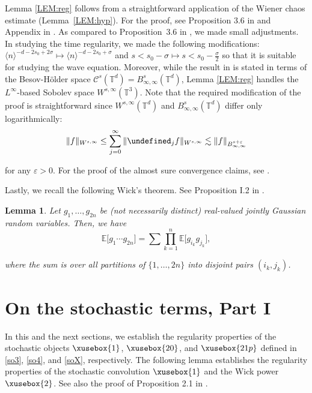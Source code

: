\documentclass[%
11pt,  reqno]{amsart}
\def\<#1>{\xusebox{#1}}
\newtheorem{lemma}[theorem]{Lemma}
\newcommand{\1}{\hspace{0.2mm}\text{I}\hspace{0.2mm}}
\newcommand{\noi}{\noindent}
\newcommand{\T}{\mathbb{T}}
\let\P= \undefined
\newcommand{\P}{\mathbf{P}}
\newcommand{\E}{\mathbb{E}}
\newcommand{\eps}{\varepsilon}
\newcommand{\s}{\sigma}
\newcommand{\les}{\lesssim}
\newcommand{\jb}[1]
{\langle #1 \rangle}
\numberwithin{equation}{section}
\numberwithin{theorem}{section}
\begin{document}
Lemma \ref{LEM:reg} follows
from a straightforward application of the Wiener chaos estimate
(Lemma~\ref{LEM:hyp}).
For the proof, see Proposition 3.6 in \cite{MWX}
and  Appendix in \cite{OOTz}.
As compared to  Proposition~3.6 in \cite{MWX}, 
we made small adjustments.
In studying the time regularity, we 
made the following modifications:
$\jb{n}^{ - d - 2s_0+ 2\s}\mapsto\jb{n}^{ - d - 2s_0+ \s}$
and $s < s_0 - \s \mapsto s < s_0 - \frac \s2$  
so that it is suitable
for studying  the wave equation.
Moreover, while the result in \cite{MWX} is stated in terms of the
Besov-H\"older space $\mathcal{C}^s(\T^d) = B^s_{\infty, \infty}(\T^d)$, 
Lemma \ref{LEM:reg} handles the $L^\infty$-based Sobolev space $W^{s, \infty}(\T^3)$.
Note that 
the required modification of the proof is straightforward
since $W^{s, \infty}(\T^d)$ and $B^s_{\infty, \infty}(\T^d)$
differ only logarithmically:
\[ \| f \|_{W^{s, \infty}} \leq 
\sum_{j = 0}^\infty
 \|\P_j f \|_{W^{s, \infty}}
 \les \| f\|_{B^{s+\eps}_{\infty, \infty}}\]

\noi
for any $\eps > 0$.
For the proof of the almost sure convergence claims, 
see \cite{OOTz}.










Lastly, we recall the following Wick's theorem.
See Proposition I.2 in \cite{Simon}.

\begin{lemma}\label{LEM:Wick}	
Let $g_1, \dots, g_{2n}$ be \textup{(}not necessarily distinct\textup{)}
 real-valued jointly Gaussian random variables.
Then, we have
\[ \E\big[ g_1 \cdots g_{2n}\big]
= \sum  \prod_{k = 1}^n \E\big[g_{i_k} g_{j_k} \big], 
\]


\noi
where the sum is over all partitions of $\{1, \dots, 2 n\}$
into disjoint pairs $(i_k, j_k)$.
\end{lemma}









\section{On the stochastic terms, Part I}
\label{SEC:sto1}

In this and the next sections, 
we establish the regularity properties
of the stochastic objects 
$\<1>$, $\<20>$, and $\<21p>$ defined in \eqref{so3},
\eqref{so4}, and \eqref{soX}, respectively.
The following lemma establishes the regularity properties
of the stochastic convolution $\<1>$ and the Wick power $\<2>$.
See also the proof of Proposition 2.1 in \cite{GKO}.
\end{document}
